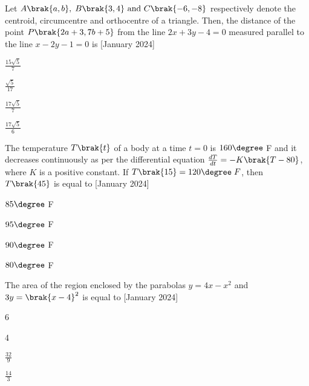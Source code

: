 \iffalse
\title{2024}
\author{EE24BTECH11063}
\section{mcq-single}
\fi
\item Let $A\brak{a,b},\;B\brak{3,4}\text{ and } C\brak{-6,-8}$ respectively denote the centroid, circumcentre and orthocentre of a triangle. Then, the distance of the point $P\brak{2a+3,7b+5}$ from the line $2x+3y-4=0$ measured parallel to the line $x-2y-1=0$ is \hfill{[January 2024]}
    \begin{enumerate}
        \begin{multicols}{4}
        \item $\frac{15\sqrt{5}}{7}$
            \item $\frac{\sqrt{5}}{17}$
            \item $\frac{17\sqrt{5}}{7}$
            \item $\frac{17\sqrt{5}}{6}$
        \end{multicols}
    \end{enumerate}
    \bigskip
\item The temperature $T\brak{t}$ of a body at a time $t=0$ is $160\degree$ F and it decreases continuously as per the differential equation $\frac{dT}{dt}=-K\brak{T-80}$, where $K$ is a positive constant. If $T\brak{15}=120\degree \;F$, then $T\brak{45}$ is equal to \hfill{[January 2024]}
\begin{enumerate}
    \begin{multicols}{4}
        \item $85\degree$ F
        \item $95\degree$ F
        \item $90\degree$ F
        \item $80\degree$ F
    \end{multicols}
\end{enumerate}
\bigskip
\item The area of the region enclosed by the parabolas $y=4x-x^2$ and $3y=\brak{x-4}^2$ is equal to \hfill{[January 2024]}
\begin{enumerate}
    \begin{multicols}{4}
        \item 6
        \item 4
        \item $\frac{32}{9}$
        \item $\frac{14}{3}$
    \end{multicols}
\end{enumerate}

